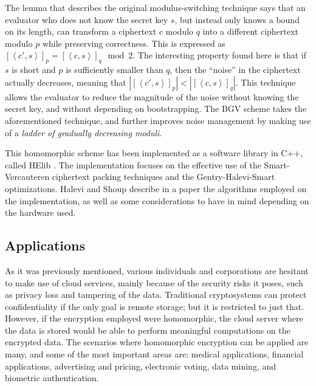 The lemma that describes the original modulus-switching technique says that an evaluator who does not know the secret key $s$, but instead only knows a bound on its length, can transform a ciphertext $c$ modulo $q$ into a different ciphertext modulo $p$ while preserving correctness. This is expressed as $[\left \langle c',s \right \rangle]_{p} = [\left \langle c,s  \right \rangle]_{q} \mod 2$. The interesting property found here is that if $s$ is short and $p$ is sufficiently smaller than $q$, then the ``noise'' in the ciphertext actually decreases, meaning that $|[\left \langle c',s \right \rangle]_{p}| < |[\left \langle c,s \right \rangle]_{q}|$. This technique allows the evaluator to reduce the magnitude of the noise without knowing the secret key, and without depending on bootstrapping. The BGV scheme takes the aforementioned technique, and further improves noise management by making use of a \emph{ladder of gradually decreasing moduli}.  

This homomorphic scheme has been implemented as a software library in C++, called HElib \cite{helib}. The implementation focuses on the effective use of the Smart-Vercauteren ciphertext packing techniques and the Gentry-Halevi-Smart optimizations. Halevi and Shoup \cite{cryptoeprint:2014:106} describe in a paper the algorithms employed on the implementation, as well as some considerations to have in mind depending on the hardware used.

\subsection{Applications}

As it was previously mentioned, various individuals and corporations are hesitant to make use of cloud services, mainly because of the security risks it poses, such as privacy loss and tampering of the data. Traditional cryptosystems can protect confidentiality if the only goal is remote storage; but it is restricted to just that. However, if the encryption employed were homomorphic, the cloud server where the data is stored would be able to perform meaningful computations on the encrypted data.  The scenarios where homomorphic encryption can be applied are many, and some of the most important areas are: medical applications, financial applications, advertising and pricing, electronic voting, data mining, and biometric authentication.

